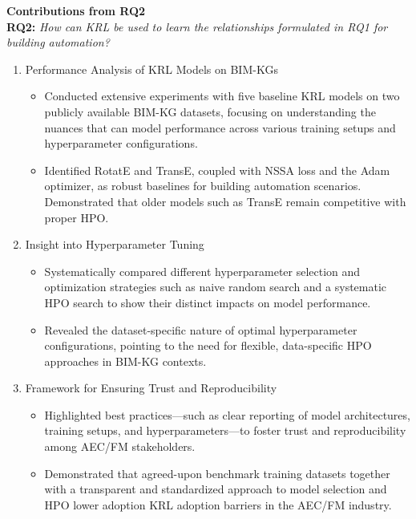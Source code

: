 \noindent \textbf{Contributions from RQ2}\\
\noindent \textbf{RQ2:} \textit{How can KRL be used to learn the relationships formulated in RQ1 for building automation?}

\begin{enumerate}
\item 
Performance Analysis of \ac{KRL} Models on \acp{BIM-KG}
    \begin{itemize}
    \item 
    Conducted extensive experiments with five baseline \ac{KRL} models on two publicly available \ac{BIM-KG} datasets, focusing on understanding the nuances that can model performance across various training setups and hyperparameter configurations.

    \item 
    Identified RotatE and TransE, coupled with NSSA loss and the Adam optimizer, as robust baselines for building automation scenarios. Demonstrated that older models such as TransE remain competitive with proper \ac{HPO}.
    \end{itemize}

\item 
Insight into Hyperparameter Tuning
    \begin{itemize}
    \item 
    Systematically compared different hyperparameter selection and optimization strategies such as naive random search and a systematic \ac{HPO} search to show their distinct impacts on model performance.
    \item 
    Revealed the dataset-specific nature of optimal hyperparameter configurations, pointing to the need for flexible, data-specific \ac{HPO} approaches in \ac{BIM-KG} contexts.
    \end{itemize} 
\item 
Framework for Ensuring Trust and Reproducibility
    \begin{itemize}
    \item 
    Highlighted best practices—such as clear reporting of model architectures, training setups, and hyperparameters—to foster trust and reproducibility among \ac{AEC/FM} stakeholders.
    \item 
    Demonstrated that agreed-upon benchmark training datasets together with a transparent and standardized approach to model selection and \ac{HPO} lower adoption \ac{KRL} adoption barriers in the \ac{AEC/FM} industry.
    \end{itemize} 
\end{enumerate}

